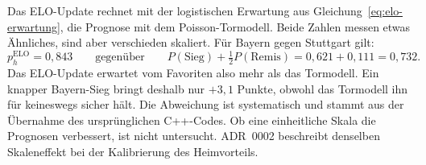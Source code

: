 \begin{achtung}
Das ELO-Update rechnet mit der logistischen Erwartung aus
Gleichung~\eqref{eq:elo-erwartung}, die Prognose mit dem Poisson-Tormodell.
Beide Zahlen messen etwas Ähnliches, sind aber verschieden skaliert. Für
Bayern gegen Stuttgart gilt:
\[
  p_h^{\text{ELO}} = 0{,}843
  \qquad\text{gegenüber}\qquad
  P(\text{Sieg}) + \tfrac12 P(\text{Remis}) = 0{,}621 + 0{,}111 = 0{,}732.
\]
Das ELO-Update erwartet vom Favoriten also mehr als das Tormodell. Ein
knapper Bayern-Sieg bringt deshalb nur $+3{,}1$ Punkte, obwohl das
Tormodell ihn für keineswegs sicher hält. Die Abweichung ist
systematisch und stammt aus der Übernahme des ursprünglichen C++-Codes. Ob
eine einheitliche Skala die Prognosen verbessert, ist nicht untersucht. ADR~0002 beschreibt denselben Skaleneffekt bei der
Kalibrierung des Heimvorteils.
\end{achtung}
